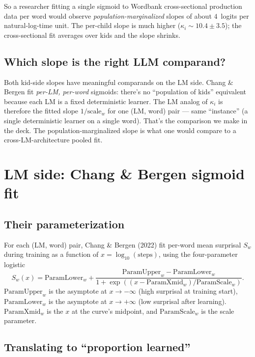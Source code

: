 \documentclass[11pt]{article}
\begin{document}
So a researcher fitting a single sigmoid to Wordbank cross-sectional
production data per word would observe \emph{population-marginalized}
slopes of about $4$~logits per natural-log-time unit. The per-child
slope is much higher ($\kappa_i \sim 10.4 \pm 3.5$); the cross-sectional
fit averages over kids and the slope shrinks.

\subsection{Which slope is the right LLM comparand?}

Both kid-side slopes have meaningful comparands on the LM side. Chang
\& Bergen fit \emph{per-LM, per-word} sigmoids: there's no
``population of kids'' equivalent because each LM is a fixed
deterministic learner. The LM analog of $\kappa_i$ is therefore the
fitted slope $1/\text{scale}_w$ for one (LM, word) pair --- same
``instance'' (a single deterministic learner on a single word).
That's the comparison we make in the deck. The
population-marginalized slope is what one would compare to a
cross-LM-architecture pooled fit.

\section{LM side: Chang \& Bergen sigmoid fit}

\subsection{Their parameterization}

For each (LM, word) pair, Chang \& Bergen (2022) fit per-word mean
surprisal $S_w$ during training as a function of $x = \log_{10}(\text{steps})$,
using the four-parameter logistic
\begin{equation}
S_w(x) = \mathrm{ParamLower}_w + \frac{\mathrm{ParamUpper}_w - \mathrm{ParamLower}_w}
                                       {1 + \exp((x - \mathrm{ParamXmid}_w)/\mathrm{ParamScale}_w)}.
\label{eq:cb-fit}
\end{equation}
$\mathrm{ParamUpper}_w$ is the asymptote at $x \to -\infty$ (high
surprisal at training start), $\mathrm{ParamLower}_w$ is the asymptote
at $x \to +\infty$ (low surprisal after learning).
$\mathrm{ParamXmid}_w$ is the $x$ at the curve's midpoint, and
$\mathrm{ParamScale}_w$ is the scale parameter.

\subsection{Translating to ``proportion learned''}
\end{document}

